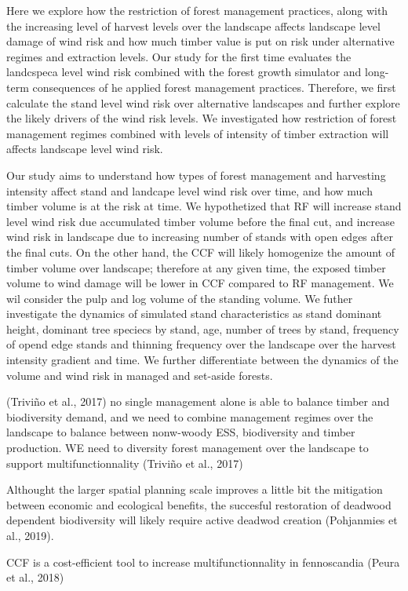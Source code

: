 \documentclass[]{elsarticle} %
\begin{document}
Here we explore how the restriction of forest management practices, along with the increasing level of harvest levels over the landscape affects landscape level damage of wind risk and how much timber value is put on risk under alternative regimes and extraction levels. Our study for the first time evaluates the landcspeca level wind risk combined with the forest growth simulator and long-term consequences of he applied forest management practices. Therefore, we first calculate the stand level wind risk over alternative landscapes and further explore the likely drivers of the wind risk levels. We investigated how restriction of forest management regimes combined with levels of intensity of timber extraction will affects landscape level wind risk.

Our study aims to understand how types of forest management and harvesting intensity affect stand and landcape level wind risk over time, and how much timber volume is at the risk at time. We hypothetized that RF will increase stand level wind risk due accumulated timber volume before the final cut, and increase wind risk in landscape due to increasing number of stands with open edges after the final cuts. On the other hand, the CCF will likely homogenize the amount of timber volume over landscape; therefore at any given time, the exposed timber volume to wind damage will be lower in CCF compared to RF management. We wil consider the pulp and log volume of the standing volume. We futher investigate the dynamics of simulated stand characteristics as stand dominant height, dominant tree speciecs by stand, age, number of trees by stand, frequency of opend edge stands and thinning frequency over the landscape over the harvest intensity gradient and time. We further differentiate between the dynamics of the volume and wind risk in managed and set-aside forests.

(Triviño et al., 2017) no single management alone is able to balance timber and biodiversity demand, and we need to combine management regimes over the landscape to balance between nonw-woody ESS, biodiversity and timber production. WE need to diversity forest management over the landscape to support multifunctionnality (Triviño et al., 2017)

Althought the larger spatial planning scale improves a little bit the mitigation between economic and ecological benefits, the succesful restoration of deadwood dependent biodiversity will likely require active deadwod creation (Pohjanmies et al., 2019).

CCF is a cost-efficient tool to increase multifunctionnality in fennoscandia (Peura et al., 2018)
\end{document}
